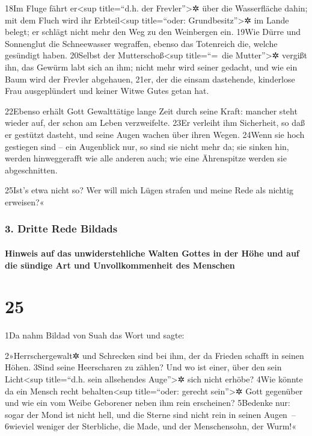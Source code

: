 18Im Fluge fährt er\textless sup title=``d.h. der Frevler''\textgreater✲
über die Wasserfläche dahin; mit dem Fluch wird ihr Erbteil\textless sup
title=``oder: Grundbesitz''\textgreater✲ im Lande belegt; er schlägt
nicht mehr den Weg zu den Weinbergen ein. 19Wie Dürre und Sonnenglut die
Schneewasser wegraffen, ebenso das Totenreich die, welche gesündigt
haben. 20Selbst der Mutterschoß\textless sup title=``=~die
Mutter''\textgreater✲ vergißt ihn, das Gewürm labt sich an ihm; nicht
mehr wird seiner gedacht, und wie ein Baum wird der Frevler abgehauen,
21er, der die einsam dastehende, kinderlose Frau ausgeplündert und
keiner Witwe Gutes getan hat.

22Ebenso erhält Gott Gewalttätige lange Zeit durch seine Kraft: mancher
steht wieder auf, der schon am Leben verzweifelte. 23Er verleiht ihm
Sicherheit, so daß er gestützt dasteht, und seine Augen wachen über
ihren Wegen. 24Wenn sie hoch gestiegen sind -- ein Augenblick nur, so
sind sie nicht mehr da; sie sinken hin, werden hinweggerafft wie alle
anderen auch; wie eine Ährenspitze werden sie abgeschnitten.

25Ist's etwa nicht so? Wer will mich Lügen strafen und meine Rede als
nichtig erweisen?«

\hypertarget{dritte-rede-bildads}{%
\subsubsection{3. Dritte Rede Bildads}\label{dritte-rede-bildads}}

\hypertarget{hinweis-auf-das-unwiderstehliche-walten-gottes-in-der-huxf6he-und-auf-die-suxfcndige-art-und-unvollkommenheit-des-menschen}{%
\paragraph{Hinweis auf das unwiderstehliche Walten Gottes in der Höhe
und auf die sündige Art und Unvollkommenheit des
Menschen}\label{hinweis-auf-das-unwiderstehliche-walten-gottes-in-der-huxf6he-und-auf-die-suxfcndige-art-und-unvollkommenheit-des-menschen}}

\hypertarget{section-24}{%
\section{25}\label{section-24}}

1Da nahm Bildad von Suah das Wort und sagte:

2»Herrschergewalt✲ und Schrecken sind bei ihm, der da Frieden schafft in
seinen Höhen. 3Sind seine Heerscharen zu zählen? Und wo ist einer, über
den sein Licht\textless sup title=``d.h. sein allsehendes
Auge''\textgreater✲ sich nicht erhöbe? 4Wie könnte da ein Mensch recht
behalten\textless sup title=``oder: gerecht sein''\textgreater✲ Gott
gegenüber und wie ein vom Weibe Geborener neben ihm rein erscheinen?
5Bedenke nur: sogar der Mond ist nicht hell, und die Sterne sind nicht
rein in seinen Augen~-- 6wieviel weniger der Sterbliche, die Made, und
der Menschensohn, der Wurm!«

